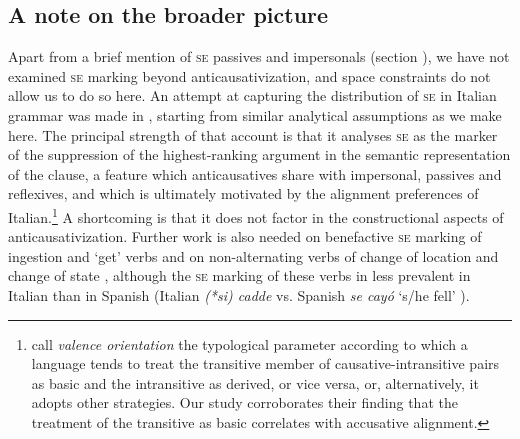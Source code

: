 \documentclass[output=paper,colorlinks,citecolor=brown
]{langscibook}
\begin{document}
\subsection{A note on the broader picture}
\label{bentley_section_5.5}

Apart from a brief mention of \textsc{se} passives and impersonals (section ), we have not examined \textsc{se} marking beyond anticausativization, and space constraints do not allow us to do so here. An attempt at capturing the distribution of \textsc{se} in Italian grammar was made in \citet{bentley2006split}, starting from similar analytical assumptions as we make here. The principal strength of that account is that it analyses \textsc{se} as the marker of the suppression of the highest-ranking argument in the semantic representation of the clause, a feature which anticausatives share with impersonal, passives and reflexives, and which is ultimately motivated by the alignment preferences of Italian.\footnote{\citet{nichols2004transitivizing} call \textit{valence orientation} the typological parameter according to which a language tends to treat the transitive member of causative-intransitive pairs as basic and the intransitive as derived, or vice versa, or, alternatively, it adopts other strategies. Our study corroborates their finding that the treatment of the transitive as basic correlates with accusative alignment.}  A shortcoming is that it does not factor in the constructional aspects of anticausativization. Further work is also needed on benefactive \textsc{se} marking of ingestion and ‘get’ verbs \citep[153—154]{bentley2006split} and on non-alternating verbs of change of location and change of state \citep{miguel2000operador,gonzales2006construcciones,jimenez2017causativity}, although the \textsc{se} marking of these verbs in less prevalent in Italian than in Spanish (Italian \textit{(*si) cadde} vs. Spanish \textit{se cayó} ‘s/he fell’ ). 
\end{document}
